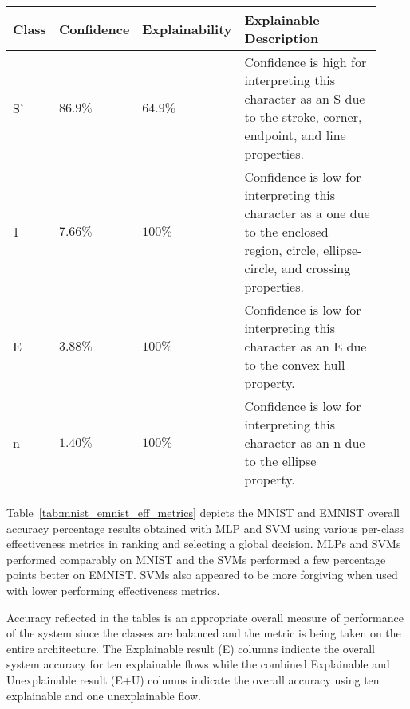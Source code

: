 \begin{table}[H]
    \renewcommand{\arraystretch}{1.3}
     \label{table:exexample4epars}
    \begin{tabular}{| m{0.06\linewidth} | m{0.14\linewidth} | m{0.17\linewidth} | m{0.55\linewidth} |}
    \hline
     Class & Confidence & Explainability & Explainable Description \\
    \hline \hline
    S\rq & $86.9\%$ & $64.9\%$ & Confidence is high for interpreting this character as an S due to the stroke, corner, endpoint, and line properties. \\ 
    \hline
    1 & $7.66\%$ & $100\%$ & Confidence is low for interpreting this character as a one due to the enclosed region, circle, ellipse-circle, and crossing properties. \\
    \hline
    E & $3.88\%$ & $100\%$ & Confidence is low for interpreting this character as an E due to the convex hull property. \\
    \hline
    n & $1.40\%$ & $100\%$ & Confidence is low for interpreting this character as an n due to the ellipse property. \\
    \hline
    \end{tabular}
\end{table}   

Table~\ref{tab:mnist_emnist_eff_metrics} depicts the MNIST and EMNIST overall
accuracy percentage results obtained with MLP and SVM using various per-class
effectiveness metrics in ranking and selecting a global decision. MLPs and SVMs
performed comparably on MNIST and the SVMs performed a few percentage points
better on EMNIST.  SVMs also appeared to be more forgiving when used with lower
performing effectiveness metrics. 

Accuracy reflected in the tables is an appropriate overall measure of
performance of the system since the classes are balanced and the metric is being
taken on the entire architecture. The Explainable result (E) columns indicate
the overall system accuracy for ten explainable flows while the combined
Explainable and Unexplainable result (E+U) columns indicate the overall
accuracy using ten explainable and one unexplainable flow.

